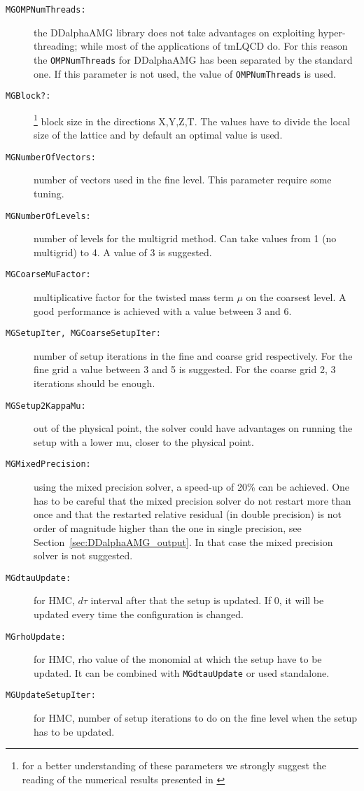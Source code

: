 \begin{description}
	\item[\texttt{MGOMPNumThreads:}] the DDalphaAMG library does not take advantages on exploiting hyper-threading; while most of the applications of tmLQCD do. For this reason the \texttt{OMPNumThreads} for DDalphaAMG has been separated by the standard one. If this parameter is not used, the value of \texttt{OMPNumThreads} is used.
	\item[\texttt{MGBlock?:}]\footnote{\label{fn:Alexandrou:2016} for a better understanding of these parameters we strongly suggest the reading of the numerical results presented in \cite{Alexandrou:2016}} block size in the directions X,Y,Z,T. The values have to divide the local size of the lattice and by default an optimal value is used.
	\item[\texttt{MGNumberOfVectors:}] number of vectors used in the fine level. This parameter require some tuning.
	\item[\texttt{MGNumberOfLevels:}] number of levels for the multigrid method. Can take values from 1 (no multigrid) to 4. A value of 3 is suggested.
	\item[\texttt{MGCoarseMuFactor:}] multiplicative factor for the twisted mass term $\mu$ on the coarsest level. A good performance is achieved with a value between 3 and 6.
	\item[\texttt{MGSetupIter, MGCoarseSetupIter:}] number of setup iterations in the fine and coarse grid respectively. For the fine grid a value between 3 and 5 is suggested. For the coarse grid 2, 3 iterations should be enough. 
	\item[\texttt{MGSetup2KappaMu:}] out of the physical point, the
          solver could have advantages on running the setup with a
          lower mu, closer to the physical point.
	\item[\texttt{MGMixedPrecision:}] using the mixed precision solver,
          a speed-up of 20\% can be achieved. One has to be careful
          that the mixed precision solver do not restart more than
          once and that the restarted relative residual (in double
          precision) is not order of magnitude higher than the one in single
          precision, see Section~\ref{sec:DDalphaAMG_output}. In that
          case the mixed precision solver is not suggested.
	\item[\texttt{MGdtauUpdate:}] for HMC, $d\tau$ interval after that the setup is updated. If 0, it will be updated every time the configuration is changed.
	\item[\texttt{MGrhoUpdate:}] for HMC, rho value of the monomial at which the setup have to be updated. It can be combined with \texttt{MGdtauUpdate} or used standalone.
	\item[\texttt{MGUpdateSetupIter:}] for HMC, number of setup iterations to do on the fine level when the setup has to be updated.
\end{description}
